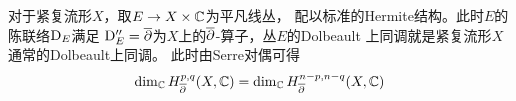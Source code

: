 
\begin{rem}对于紧复流形$X$，取$E\to X\times\mathbb{C}$为平凡线丛，
配以标准的Hermite结构。此时$E$的陈联络$\mathrm{D}_E$满足
$\mathrm{D}_E''=\overline{\partial}$为$X$上的$\overline{\partial}$-算子，丛$E$的Dolbeault
上同调就是紧复流形$X$通常的Dolbeault上同调。
此时由Serre对偶可得
$$
  \dim_{\mathbb{C}}H^{p,q}_{\overline{\partial}}(X,\mathbb{C})
= \dim_{\mathbb{C}}H^{n-p,n-q}_{\overline{\partial}}(X,\mathbb{C})
$$
\end{rem}







